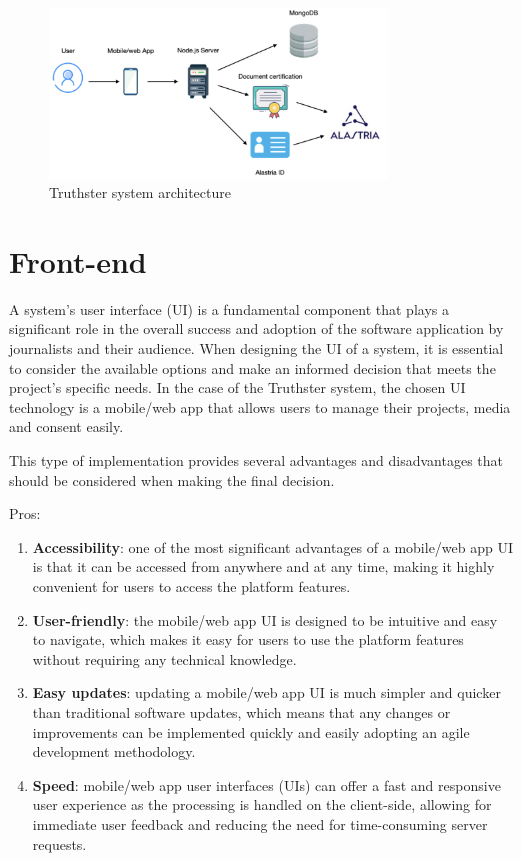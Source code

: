 \documentclass[target=mst,aauheader=]{thud}
\begin{document}
\begin{figure}
    \centering
    \includegraphics[width=0.8\textwidth]{images/technicalArchitectureStructuralView.png}
    \caption{Truthster system architecture}
    \label{fig:truthsterArchitecture}
\end{figure}


\section{Front-end}

A system's user interface (UI) is a fundamental component that plays a significant role in the overall success and adoption of the software application by journalists and their audience. When designing the UI of a system, it is essential to consider the available options and make an informed decision that meets the project's specific needs.
In the case of the Truthster system, the chosen UI technology is a mobile/web app that allows users to manage their projects, media and consent easily.\par
This type of implementation provides several advantages and disadvantages that should be considered when making the final decision.

Pros:

\begin{enumerate}

    \item \textbf{Accessibility}: one of the most significant advantages of a mobile/web app UI is that it can be accessed from anywhere and at any time, making it highly convenient for users to access the platform features.
    \item \textbf{User-friendly}: the mobile/web app UI is designed to be intuitive and easy to navigate, which makes it easy for users to use the platform features without requiring any technical knowledge.
    \item \textbf{Easy updates}: updating a mobile/web app UI is much simpler and quicker than traditional software updates, which means that any changes or improvements can be implemented quickly and easily adopting an agile development methodology.
    \item \textbf{Speed}: mobile/web app user interfaces (UIs) can offer a fast and responsive user experience as the processing is handled on the client-side, allowing for immediate user feedback and reducing the need for time-consuming server requests.

\end{enumerate}
\end{document}
